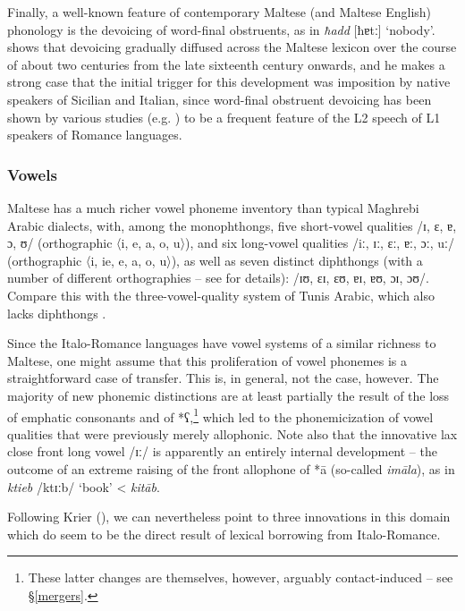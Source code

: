 \documentclass[output=paper]{langsci/langscibook}
\begin{document}
Finally, a well-known feature of contemporary Maltese (and Maltese English) phonology is the devoicing of word-final obstruents, as in \textit{ħadd} [ħɐtː] `nobody'. \cite{Avram2017devoicing} shows that devoicing gradually diffused across the Maltese lexicon over the course  of about two centuries from the late sixteenth century onwards, and he makes a strong case that the initial trigger for this development was imposition by native speakers of Sicilian and Italian, since  word-final obstruent devoicing has been shown by various studies (e.g. \citealt{Flegemunromackay1995}) to be a frequent feature of the L2 speech of L1 speakers of Romance languages.

\subsubsection{Vowels} %
Maltese has a much richer vowel phoneme inventory than typical Maghrebi Arabic dialects, with, among the monophthongs, five short-vowel qualities /ɪ, ɛ, ɐ, ɔ, ʊ/ (orthographic 〈i, e, a, o, u〉), and six long-vowel qualities /iː, ɪː, ɛː, ɐː, ɔː, uː/ (orthographic 〈i, ie, e, a, o, u〉), as well as seven distinct diphthongs (with a number of different orthographies -- see \citealt[299]{BorgAzzopardi-Alexander1997} for details): /ɪʊ, ɛɪ, ɛʊ, ɐɪ, ɐʊ, ɔɪ, ɔʊ/. Compare this with the three-vowel-quality system of Tunis Arabic, which also lacks diphthongs \citep{Gibson2011}. 

Since the Italo-Romance languages have vowel systems of a similar richness to Maltese, one might assume that this proliferation of vowel phonemes is a straightforward case of transfer. This is, in general, not the case, however. The majority of new phonemic distinctions are at least partially the result of the loss of emphatic consonants and of *ʕ,\footnote{These latter changes are themselves, however, arguably contact-induced -- see §\ref{mergers}.} which led to the phonemicization of vowel qualities that were previously merely allophonic. Note also that the innovative lax close front long vowel /ɪː/ is apparently an entirely internal development -- the outcome of an extreme raising of the front allophone of *\={a} (so-called \textit{im\={a}la}), as in \textit{ktieb} /ktɪːb/ `book' < \textit{kit\={a}b}.

Following Krier (\citeyear[21--22]{krier1976}), we can nevertheless point to three innovations in this domain which do seem to be the direct result of lexical borrowing from Italo-Romance.
\end{document}
